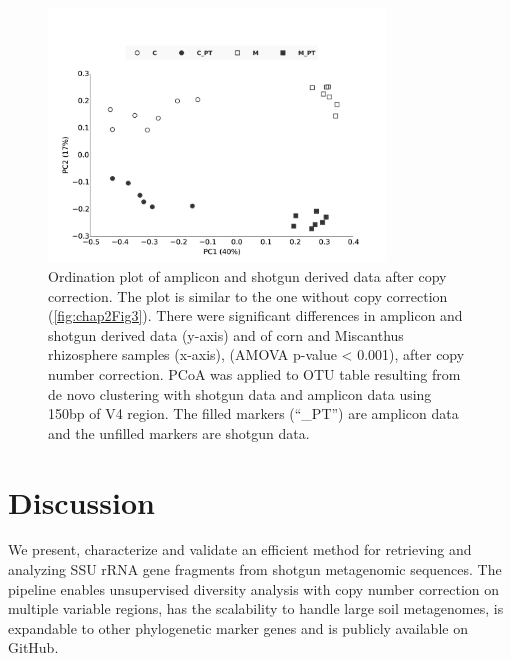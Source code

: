 \documentclass[]{msu-thesis}
\begin{document}
\begin{figure}[tbph!]
  \centering
  \includegraphics[width=0.80\textwidth]{figs/chap2_figS9}
  \caption[Ordination plot of amplicon and shotgun derived data after copy correction]{Ordination plot of amplicon and shotgun derived data after copy correction. The plot is similar to the one without copy correction (\cref{fig:chap2Fig3}). There were significant differences in amplicon and shotgun derived data (y-axis) and of corn and Miscanthus rhizosphere samples (x-axis), (AMOVA p-value < 0.001), after copy number correction. PCoA was applied to OTU table resulting from de novo clustering with shotgun data and amplicon data using 150bp of V4 region. The filled markers (``\_PT'') are amplicon data and the unfilled markers are shotgun data.}
  \label{fig:chap2FigS9}
\end{figure}


\section{Discussion}

We present, characterize and validate an efficient method for retrieving and analyzing SSU rRNA gene fragments from shotgun metagenomic sequences. The pipeline enables unsupervised diversity analysis with copy number correction on multiple variable regions, has the scalability to handle large soil metagenomes, is expandable to other phylogenetic marker genes and is publicly available on GitHub.
\end{document}

